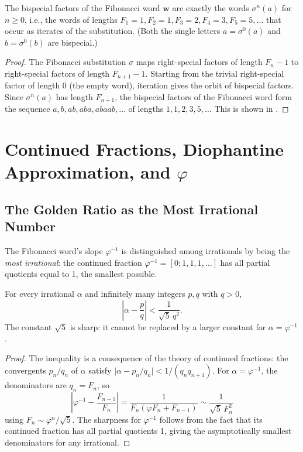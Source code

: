 \begin{proposition}%
  \label{prop:bispecial}
  The bispecial factors of the Fibonacci word \(\mathbf{w}\) are
  exactly the words \(\sigma^n(a)\) for \(n\geq 0\), i.e., the
  words of lengths \(F_1=1,F_2=1,F_3=2,F_4=3,F_5=5,\ldots\) that
  occur as iterates of the substitution.  (Both the single letters
  \(a=\sigma^0(a)\) and \(b=\sigma^0(b)\) are bispecial.)
\end{proposition}
\begin{proof}
  The Fibonacci substitution \(\sigma\) maps right-special factors
  of length \(F_n-1\) to right-special factors of length \(F_{n+1}-1\).
  Starting from the trivial right-special factor of length 0 (the
  empty word), iteration gives the orbit of bispecial factors.
  Since \(\sigma^n(a)\) has length \(F_{n+1}\), the bispecial factors
  of the Fibonacci word form the sequence
  \(a,b,ab,aba,abaab,\ldots\) of lengths \(1,1,2,3,5,\ldots\)
  This is shown in \cite[Proposition 2.1.19]{lothaire2002algebraic}.
\end{proof}

\section{Continued Fractions, Diophantine Approximation, and \(\varphi\)}
\label{sec:ch19-diophantine}

\subsection{The Golden Ratio as the Most Irrational Number}
\label{subsec:ch19-most-irrational}

The Fibonacci word's slope \(\varphi^{-1}\) is distinguished among
irrationals by being the \emph{most irrational}: the continued fraction
\(\varphi^{-1}=[0;1,1,1,\ldots]\) has all partial quotients equal
to 1, the smallest possible.

\begin{theorem}[Hurwitz, 1891]\label{thm:hurwitz}
  For every irrational \(\alpha\) and infinitely many integers
  \(p,q\) with \(q>0\),
  \[
    \left|\alpha - \frac{p}{q}\right| < \frac{1}{\sqrt{5}\,q^2}.
  \]
  The constant \(\sqrt{5}\) is sharp: it cannot be replaced by a
  larger constant for \(\alpha=\varphi^{-1}\).
\end{theorem}
\begin{proof}
  The inequality is a consequence of the theory of continued fractions:
  the convergents \(p_n/q_n\) of \(\alpha\) satisfy
  \(\bigl|\alpha-p_n/q_n\bigr|<1/(q_n q_{n+1})\).  For
  \(\alpha=\varphi^{-1}\), the denominators are \(q_n=F_n\), so
  \[
    \left|\varphi^{-1}-\frac{F_{n-1}}{F_n}\right|
    = \frac{1}{F_n(\varphi F_n + F_{n-1})}
    \sim \frac{1}{\sqrt{5}\,F_n^2}
  \]
  using \(F_n\sim\varphi^n/\sqrt{5}\).
  The sharpness for \(\varphi^{-1}\) follows from the fact that its
  continued fraction has all partial quotients 1, giving the
  asymptotically smallest denominators for any irrational.
\end{proof}


